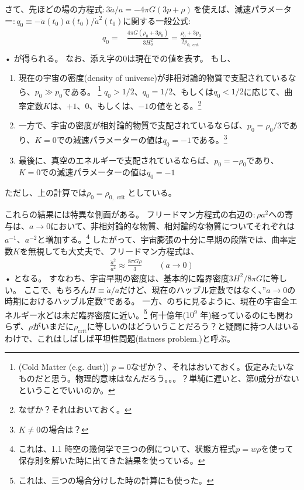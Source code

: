 \documentclass[11pt,a4paper,dvipdfmx]{jsarticle}
\theoremstyle{plain}
\theoremstyle{break}
\begin{document}
さて、先ほどの場の方程式$:3\ddot{a}/{a}=-4 \pi G(3 p+\rho)\,$を使えば、減速パラメーター$:q_{0} \equiv-\ddot{a}\left(t_{0}\right) a\left(t_{0}\right) / \dot{a}^{2}\left(t_{0}\right)$に関する一般公式:
\begin{align}
  q_{0}
    =&\frac{4 \pi G\left(\rho_{0}+3 p_{0}\right)}{3 H_{0}^{2}}=\frac{\rho_{0}+3 p_{0}}{2 \rho_{0, \text { crit }}}  \\
\end{align}•%
が得られる。
なお、添え字の$0$は現在での値を表す。
もし、
\begin{enumerate}
\item 現在の宇宙の密度(density of universe)が非相対論的物質で支配されているなら、$p_0 \gg p_0$である。 
\footnote{(Cold Matter (e.g. dust)) $p=0$なぜか？、それはおいておく。仮定みたいなものだと思う。物理的意味はなんだろう。。。？単純に遅いと、第0成分がないということでいいのか。}
$q_0 > 1/2$、$q_0 = 1/2$、もしくは$q_0 < 1/2$に応じて、曲率定数$K$は、$+1$、$0$、もしくは、$-1$の値をとる。\footnote{なぜか？それはおいておく。}

\item 一方で、宇宙の密度が相対論的物質で支配されているならば、$p_0 = \rho_0 /3$であり、$K=0$での減速パラメーターの値は$q_0 = -1$である。\footnote{$K \neq 0 $の場合は？}

\item 最後に、真空のエネルギーで支配されているならば、$p_0 = - \rho_0$であり、$K=0$での減速パラメーターの値は$q_0 =-1$
\end{enumerate}
ただし、上の計算では$\rho_0 = \rho_{0, \text{ crit }}$としている。

これらの結果には特異な側面がある。
フリードマン方程式の右辺の$:\rho a^2$への寄与は、$a \to 0$において、非相対論的な物質、相対論的な物質についてそれぞれは$a^{-1}$、$a^{-2}$と増加する。\footnote{これは、1.1 時空の幾何学で三つの例について、状態方程式$p=w \rho$を使って保存則を解いた時に出てきた結果を使っている。}
したがって、宇宙膨張の十分に早期の段階では、曲率定数$K$を無視しても大丈夫で、フリードマン方程式は、
\begin{align}
  \frac{\dot{a}^2}{a^2}  \approx \frac{8 \pi G \rho}{3} \qquad (a \to 0)
\end{align}•%
となる。
すなわち、宇宙早期の密度は、基本的に臨界密度$3H^2/8\pi G$に等しい。
ここで、もちろん$H \equiv \dot{a} / a$だけど、現在のハッブル定数ではなく、”$a\to 0 $の時期におけるハッブル定数”である。
一方、のちに見るように、現在の宇宙全エネルギー水どは未だ臨界密度に近い。\footnote{これは、三つの場合分けした時の計算にも使った。}
何十億年($10^9$ 年)経っているのにも関わらず、$\rho$がいまだに$\rho_{\text{crit}}$に等しいのはどういうことだろう？と疑問に持つ人はいるわけで、これはしばしば平坦性問題(flatness problem.)と呼ぶ。
\end{document}
